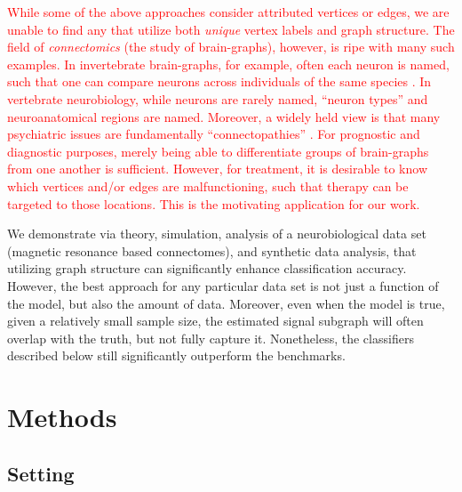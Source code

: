 \documentclass[10pt,journal,cspaper,compsoc]{IEEEtran}
\providecommand{\tr}[1]{\textcolor{red}{#1}}
\begin{document}
\tr{While some of the above approaches consider attributed vertices or edges, we are unable to find any that utilize both \emph{unique} vertex labels and graph structure. The field of \emph{connectomics} (the study of brain-graphs), however, is ripe with many such examples.  In invertebrate brain-graphs, for example, often each neuron is named, such that one can compare neurons across individuals of the same species \cite{North2007}.  In vertebrate neurobiology, while neurons are rarely named, ``neuron types''  \cite{Shepherd2007} and neuroanatomical regions \cite{Nolte2002} are named.  Moreover, a widely held view is that many psychiatric issues are fundamentally ``connectopathies'' \cite{LichtmanSanes08, Bassett2009}.  For prognostic and diagnostic purposes, merely being able to differentiate groups of brain-graphs from one another is sufficient.  However, for treatment, it is desirable to know which vertices and/or edges are malfunctioning, such that therapy can be targeted to those locations. This is the motivating application for our work.}

We demonstrate via theory, simulation, analysis of a neurobiological data set (magnetic resonance based connectomes), and synthetic data analysis, that utilizing graph structure can significantly enhance classification accuracy.  However, the best approach for any particular data set is not just a function of the model, but also the amount of data.  Moreover, even when the model is true, given a relatively small sample size, the estimated signal subgraph will often overlap with the truth, but not fully capture it.  Nonetheless, the classifiers described below still significantly outperform the benchmarks.

\section{Methods} %
\label{sec:methods}




\subsection{Setting}
\end{document}
